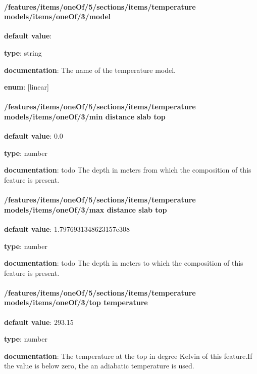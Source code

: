 \paragraph{/features/items/oneOf/5/sections/items/temperature models/items/oneOf/3/model} \begin{itemized}
\item {\bf default value}: 
\item {\bf type}: string
\item {\bf documentation}: The name of the temperature model.
\item {\bf enum}: [linear]\end{itemized}\paragraph{/features/items/oneOf/5/sections/items/temperature models/items/oneOf/3/min distance slab top} \begin{itemized}
\item {\bf default value}: 0.0
\item {\bf type}: number
\item {\bf documentation}: todo The depth in meters from which the composition of this feature is present.
\end{itemized}\paragraph{/features/items/oneOf/5/sections/items/temperature models/items/oneOf/3/max distance slab top} \begin{itemized}
\item {\bf default value}: 1.7976931348623157e308
\item {\bf type}: number
\item {\bf documentation}: todo The depth in meters to which the composition of this feature is present.
\end{itemized}\paragraph{/features/items/oneOf/5/sections/items/temperature models/items/oneOf/3/top temperature} \begin{itemized}
\item {\bf default value}: 293.15
\item {\bf type}: number
\item {\bf documentation}: The temperature at the top in degree Kelvin of this feature.If the value is below zero, the an adiabatic temperature is used.

\end{itemized}
